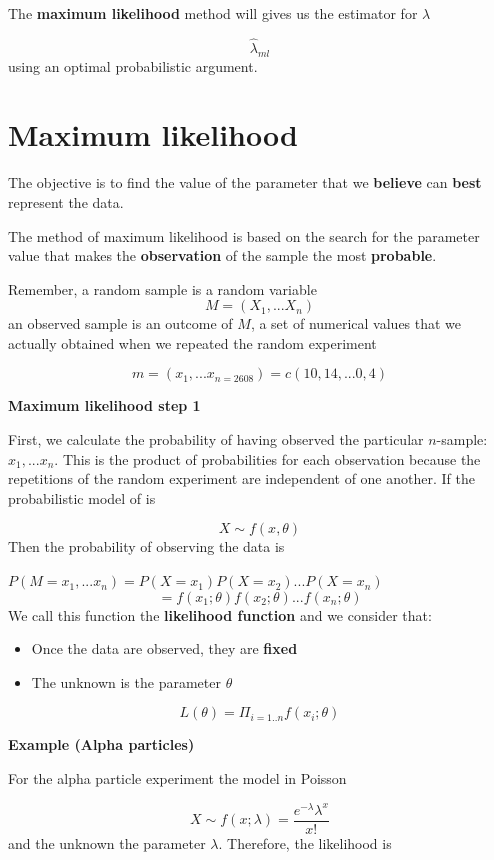 \documentclass[
]{book}
\providecommand{\tightlist}{%
  \setlength{\itemsep}{0pt}\setlength{\parskip}{0pt}}
\begin{document}
The \textbf{maximum likelihood} method will gives us the estimator for \(\lambda\)

\[\hat{\lambda}_{ml}\]
using an optimal probabilistic argument.

\hypertarget{maximum-likelihood-2}{%
\section{Maximum likelihood}\label{maximum-likelihood-2}}

The objective is to find the value of the parameter that we \textbf{believe} can \textbf{best} represent the data.

The method of maximum likelihood is based on the search for the parameter value that makes the \textbf{observation} of the sample the most \textbf{probable}.

Remember, a random sample is a random variable
\[M=(X_1,...X_n)\]
an observed sample is an outcome of \(M\), a set of numerical values that we actually obtained when we repeated the random experiment

\[m=(x_1,...x_{n=2608})=c(10, 14, ... 0, 4)\]

\textbf{Maximum likelihood step 1}

First, we calculate the probability of having observed the particular \(n\)-sample: \(x_1,...x_n\). This is the product of probabilities for each observation because the repetitions of the random experiment are independent of one another. If the probabilistic model of is

\[X \sim f(x, \theta)\]
Then the probability of observing the data is

\(P(M=x_1,...x_n)=P(X=x_1)P(X=x_2)...P(X=x_n)\)
\[=f(x_1;\theta)f(x_2;\theta) ...f(x_n;\theta)\]
We call this function the \textbf{likelihood function} and we consider that:

\begin{itemize}
\tightlist
\item
  Once the data are observed, they are \textbf{fixed}
\item
  The unknown is the parameter \(\theta\)
\end{itemize}

\[L(\theta)= \Pi_{i=1..n} f(x_i; \theta)\]

\textbf{Example (Alpha particles)}

For the alpha particle experiment the model in Poisson

\[X \sim  f(x; \lambda)= \frac{e^{-\lambda}\lambda^x}{x!}\]
and the unknown the parameter \(\lambda\). Therefore, the likelihood is
\end{document}
